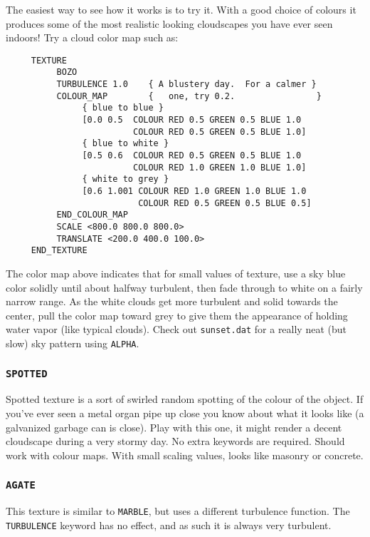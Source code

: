 The easiest way to see how it works is to try it.  With a good choice of
colours it produces some of the most realistic looking cloudscapes you have
ever seen indoors!  Try a cloud color map such as:
\begin{verbatim}
     TEXTURE
          BOZO
          TURBULENCE 1.0    { A blustery day.  For a calmer }
          COLOUR_MAP        {   one, try 0.2.                }
               { blue to blue }
               [0.0 0.5  COLOUR RED 0.5 GREEN 0.5 BLUE 1.0
                         COLOUR RED 0.5 GREEN 0.5 BLUE 1.0]
               { blue to white }
               [0.5 0.6  COLOUR RED 0.5 GREEN 0.5 BLUE 1.0
                         COLOUR RED 1.0 GREEN 1.0 BLUE 1.0]
               { white to grey }
               [0.6 1.001 COLOUR RED 1.0 GREEN 1.0 BLUE 1.0
                          COLOUR RED 0.5 GREEN 0.5 BLUE 0.5]
          END_COLOUR_MAP
          SCALE <800.0 800.0 800.0>
          TRANSLATE <200.0 400.0 100.0>
     END_TEXTURE
\end{verbatim}
The color map above indicates that for small values of texture, use a sky blue
color solidly until about halfway turbulent, then fade through to white on a
fairly narrow range.  As the white clouds get more turbulent and solid towards
the center, pull the color map toward grey to give them the appearance of
holding water vapor (like typical clouds). 
Check out {\tt sunset.dat} for a really neat (but slow) sky pattern
using {\tt ALPHA}.

\subsubsection{{\tt SPOTTED}}

Spotted texture is a sort of swirled random spotting of the colour of the
object.  If you've ever seen a metal organ pipe up close you know about what
it looks like (a galvanized garbage can is close). Play with this one, it
might render a decent cloudscape during a very stormy day.  No extra
keywords are required.  Should work with colour maps.  With small scaling
values, looks like masonry or concrete.

\subsubsection{{\tt AGATE}}

This texture is similar to {\tt MARBLE}, but uses a different turbulence
function.  The {\tt TURBULENCE} keyword has no effect, and as such it
is always very turbulent.


